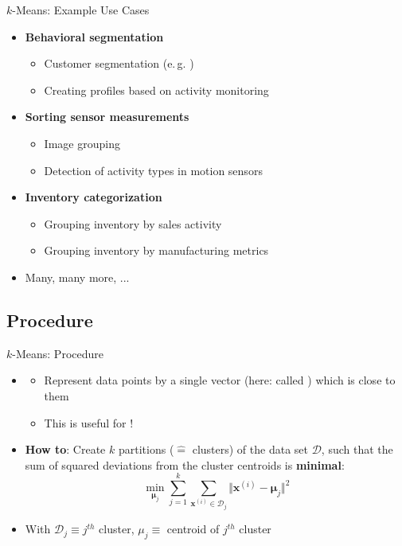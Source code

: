 \begin{frame}{$k$-Means: Example Use Cases}{}
	\begin{itemize}
		\item \textbf{Behavioral segmentation}
		\begin{itemize}
			\item Customer segmentation (e.\,g. )
			\item Creating profiles based on activity monitoring
		\end{itemize}
		\item \textbf{Sorting sensor measurements}
		\begin{itemize}
			\item Image grouping
			\item Detection of activity types in motion sensors
		\end{itemize}
		\item \textbf{Inventory categorization}
		\begin{itemize}
			\item Grouping inventory by sales activity
			\item Grouping inventory by manufacturing metrics
		\end{itemize}
		\item Many, many more, ...
	\end{itemize}
\end{frame}


\subsection{Procedure}
\begin{frame}{$k$-Means: Procedure}{}
	\begin{itemize}
		\item {}
		\begin{itemize}
			\item Represent data points by a single vector (here: called ) which is close to them
			\item This is useful for !
		\end{itemize}
		\item \textbf{How to}: Create $k$ partitions ($\widehat{=}$ clusters) of the data set $\mathcal{D}$, such that
			the sum of squared deviations from the cluster centroids is \textbf{minimal}:
		\begin{equation}
			\min_{\bm{\mu}_j} \sum_{j=1}^k \sum_{\bm{x}^{(i)} \in \mathcal{D}_j} \Vert \bm{x}^{(i)} - \bm{\mu}_j \Vert^2
		\end{equation}
		\item With $\mathcal{D}_j \equiv j^{th}$ cluster, $\mu_j \equiv$ centroid of $j^{th}$ cluster
	\end{itemize}
\end{frame}


